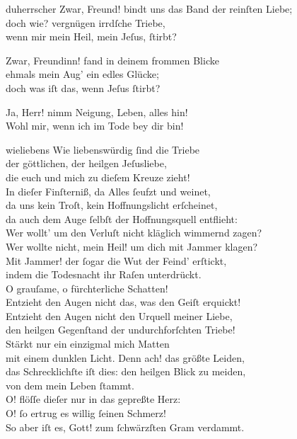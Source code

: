 \documentclass[shorttitlesize=50,tocstyle=ref-genre]{ees}
\begin{document}
{\begin{movement}{duherrscher}
    \voice[Eidli]
    Zwar, Freund! bindt uns das Band der reinſten Liebe;\\
    doch wie? vergnügen irrdſche Triebe,\\
    wenn mir mein Heil, mein Jeſus, ſtirbt?

    \voice[Lazarus]
    Zwar, Freundinn! fand in deinem frommen Blicke\\
    ehmals mein Aug’ ein edles Glücke;\\
    doch was iſt das, wenn Jeſus ſtirbt?

    Ja, Herr! nimm Neigung, Leben, alles hin!\\
    Wohl mir, wenn ich im Tode bey dir bin!
  \end{movement}

  \begin{movement}{wieliebens}
    \voice[Johannes]
    Wie liebenswürdig ſind die Triebe\\
    der göttlichen, der heilgen Jeſusliebe,\\
    die euch und mich zu dieſem Kreuze zieht!\\
    In dieſer Finſterniß, da Alles ſeufzt und weinet,\\
    da uns kein Troſt, kein Hoffnungslicht erſcheinet,\\
    da auch dem Auge ſelbſt der Hoffnungsquell entflieht:\\
    Wer wollt’ um den Verluſt nicht kläglich wimmernd zagen?\\
    Wer wollte nicht, mein Heil! um dich mit Jammer klagen?\\
    Mit Jammer! der ſogar die Wut der Feind’ erſtickt,\\
    indem die Todesnacht ihr Raſen unterdrückt.\\
    O grauſame, o fürchterliche Schatten!\\
    Entzieht den Augen nicht das, was den Geiſt erquickt!\\
    Entzieht den Augen nicht den Urquell meiner Liebe,\\
    den heilgen Gegenſtand der undurchforſchten Triebe!\\
    Stärkt nur ein einzigmal mich Matten\\
    mit einem dunklen Licht. Denn ach! das größte Leiden,\\
    das Schrecklichſte iſt dies: den heilgen Blick zu meiden,\\
    von dem mein Leben ſtammt.\\
    O! flöſſe dieſer nur in das gepreßte Herz:\\
    O! ſo ertrug es willig ſeinen Schmerz!\\
    So aber iſt es, Gott! zum ſchwärzſten Gram verdammt.
  \end{movement}

}
\end{document}
